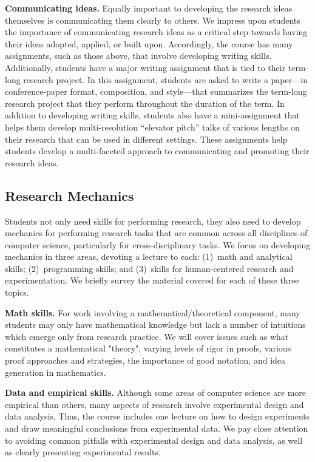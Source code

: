 \vspace*{0.1in}
\noindent
{\bf Communicating ideas.}  Equally important to developing the research
ideas themselves is communicating them clearly to others.  We impress
upon students the importance of communicating research ideas as a
critical step towards having their ideas adopted, applied, or built
upon.  Accordingly, the course has many assignments, such as those
above, that involve developing writing skills.  Additionally, students
have a major writing assignment that is tied to their term-long research
project.  In this assignment, students are asked to write a paper---in
conference-paper format, composition, and style---that summarizes the
term-long research project that they perform throughout the duration of
the term.  In addition to developing writing skills, students also have
a mini-assignment that helps them develop multi-resolution ``elevator
pitch'' talks of various lengths on their research that can be used in
different settings.  These assignments help students develop a
multi-faceted approach to communicating and promoting their research
ideas.



\subsection{Research Mechanics}

Students not only need skills for performing research, they also need to
develop mechanics for performing research tasks that are common across
all disciplines of computer science, particularly for cross-disciplinary
tasks.  We focus on developing mechanics in three areas, devoting a
lecture to each: (1)~math and analytical skills; (2)~programming skills;
and (3)~skills for human-centered research and experimentation.  We
briefly survey the material covered for each of these three topics.

\vspace*{0.1in}
\noindent
{\bf Math skills.} For work involving a mathematical/theoretical
component, many students may only have mathematical knowledge but lack a
number of intuitions which emerge only from research practice.  We will
cover issues such as what constitutes a mathematical "theory", varying
levels of rigor in proofs, various proof approaches and strategies, the
importance of good notation, and idea generation in mathematics.

\vspace*{0.1in}
\noindent
{\bf Data and empirical skills.}  Although some areas of computer
science are more empirical than others, many aspects of research involve
experimental design and data analysis.  Thus, the course includes one
lecture on how to design experiments and draw meaningful conclusions
from experimental data.  We pay close attention to avoiding common
pitfalls with experimental design and data analysis, as well as
clearly presenting experimental results.

